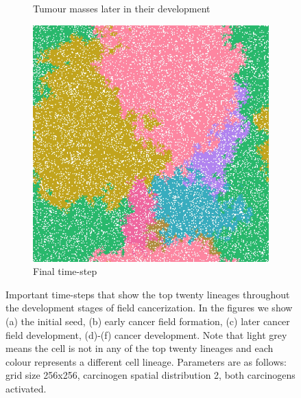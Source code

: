 \documentclass[\main/thesis.tex]{subfiles}
\begin{document}
\begin{figure}[H]
\begin{subfigure}[t]{.45\textwidth}
      \caption{Tumour masses later in their development}
      \label{fig:GeneralObservations_lateTumourLineages}
    \end{subfigure}
    \begin{subfigure}[t]{.45\textwidth}
      \centering
      \includegraphics[width=\textwidth]{images/2_GeneralObservations/Fig6/6_final.jpeg}
      \caption{Final time-step}
      \label{fig:GeneralObservations_finalLineages}
    \end{subfigure}
    \caption{Important time-steps that show the top twenty lineages throughout the development stages of field cancerization. In the figures we show (a) the initial seed, (b) early cancer field formation, (c) later cancer field development, (d)-(f) cancer development. Note that light grey means the cell is not in any of the top twenty lineages and each colour represents a different cell lineage. 
    Parameters are as follows: grid size 256x256, carcinogen spatial distribution 2, both carcinogens activated.}
    \label{fig:GeneralObservations_importantTimeStepsLineages}
\end{figure}
\end{document}
